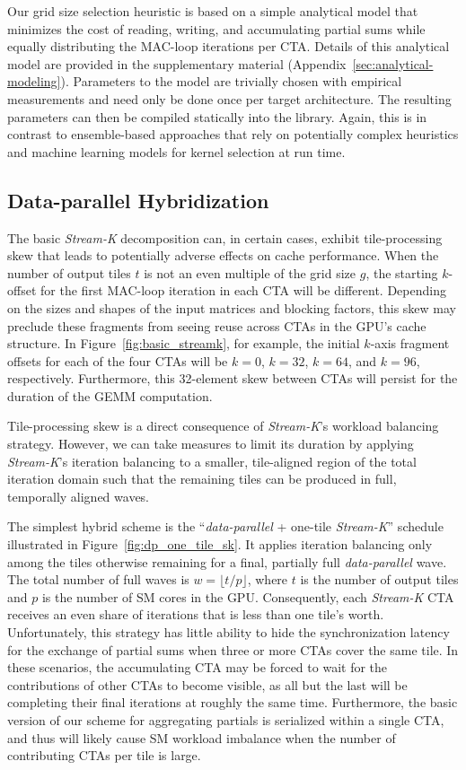 Our grid size selection heuristic is based on a simple analytical model that minimizes the cost of reading, writing, and accumulating partial sums while equally distributing the MAC-loop iterations per CTA. Details of this analytical model are provided in the supplementary material (Appendix~\ref{sec:analytical-modeling}).  Parameters to the model are trivially chosen with empirical measurements and need only be done once per target architecture.  The resulting parameters can then be compiled statically into the library.  Again, this is in contrast to ensemble-based approaches that rely on potentially complex heuristics and machine learning models for kernel selection at run time.

\subsection{Data-parallel Hybridization}
\label{sec:data-parallel-hybridization}

The basic \emph{Stream-K} decomposition can, in certain cases, exhibit tile-processing skew that leads to potentially adverse effects on cache performance. When the number of output tiles $t$ is not an even multiple of the grid size $g$, the starting $k$-offset for the first MAC-loop iteration in each CTA will be different. Depending on the sizes and shapes of the input matrices and blocking factors, this skew may preclude these fragments from seeing reuse across CTAs in the GPU's cache structure. In Figure~\ref{fig:basic_streamk}, for example, the initial $k$-axis fragment offsets for each of the four CTAs will be $k=0$, $k=32$, $k=64$, and $k=96$, respectively. Furthermore, this 32-element skew between CTAs will persist for the duration of the GEMM computation.

Tile-processing skew is a direct consequence of \emph{Stream-K}'s
workload balancing strategy.  However, we can take measures to limit its duration by applying \emph{Stream-K}'s iteration balancing to a smaller, tile-aligned region of the total iteration domain such that the remaining tiles can be produced in full, temporally aligned waves.

The simplest hybrid scheme is the
``\emph{data-parallel} + one-tile \emph{Stream-K}''
schedule illustrated in Figure~\ref{fig:dp_one_tile_sk}.  It applies iteration balancing only among the tiles otherwise remaining for a final, partially full
\emph{data-parallel} wave. The total number of full waves is $w = \lfloor t/p \rfloor$, where $t$ is the number of output tiles and $p$ is the number of SM cores in the GPU\@. Consequently, each \emph{Stream-K} CTA receives an even share of iterations that is less than one tile's worth. Unfortunately, this strategy has little ability to hide the synchronization latency for the exchange of partial sums when three or more CTAs cover the same tile. In these scenarios, the accumulating CTA may be forced to wait for the contributions of other CTAs to become visible, as all but the last will be completing their final iterations at roughly the same time. Furthermore, the basic version of our scheme for aggregating partials is serialized within a single CTA, and thus will likely cause SM workload imbalance when the number of contributing CTAs per tile is large.

